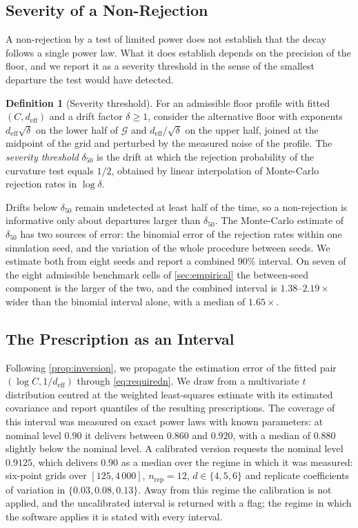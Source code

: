 \documentclass[twoside,11pt]{article}
\theoremstyle{plain}
\theoremstyle{definition}
\newtheorem{defn}{Definition}
\theoremstyle{remark}
\newcommand{\deff}{\ensuremath{d_{\mathrm{eff}}}}
\begin{document}
\subsection{Severity of a Non-Rejection}\label{sec:sizing-severity}

A non-rejection by a test of limited power does not establish that the
decay follows a single power law. What it does establish depends on the
precision of the floor, and we report it as a severity threshold in the
sense of the smallest departure the test would have detected.

\begin{defn}[Severity threshold]\label{def:severity}
For an admissible floor profile with fitted $(C, \deff)$ and a drift
factor $\delta \geq 1$, consider the alternative floor with exponents
$\deff\sqrt{\delta}$ on the lower half of $\mathcal{G}$ and
$\deff/\sqrt{\delta}$ on the upper half, joined at the midpoint of the
grid and perturbed by the measured noise of the profile. The
\emph{severity threshold} $\delta_{50}$ is the drift at which the
rejection probability of the curvature test equals $1/2$, obtained by
linear interpolation of Monte-Carlo rejection rates in $\log \delta$.
\end{defn}

Drifts below $\delta_{50}$ remain undetected at least half of the time, so
a non-rejection is informative only about departures larger than
$\delta_{50}$. The Monte-Carlo estimate of $\delta_{50}$ has two sources of
error: the binomial error of the rejection rates within one simulation
seed, and the variation of the whole procedure between seeds. We estimate
both from eight seeds and report a combined $90\%$ interval. On seven
of the eight admissible benchmark cells of \cref{sec:empirical} the
between-seed component is the larger of the two, and the combined interval
is $1.38$--$2.19\times$ wider than the binomial interval alone, with a median
of $1.65\times$.

\subsection{The Prescription as an Interval}\label{sec:sizing-interval}

Following \cref{prop:inversion}, we propagate the estimation error of the
fitted pair $(\log C, 1/\deff)$ through \cref{eq:requiredn}. We draw from a
multivariate $t$ distribution centred at the weighted least-squares estimate
with its estimated covariance and report quantiles of the resulting
prescriptions. The coverage of this interval was measured on exact power
laws with known parameters: at nominal level $0.90$ it delivers between
$0.860$ and $0.920$, with a median of $0.880$ slightly below the
nominal level. A calibrated version requests the nominal level $0.9125$,
which delivers $0.90$ as a median over the regime in which it was measured:
six-point grids over $[125, 4\,000]$, $n_{\mathrm{rep}} = 12$,
$d \in \{4, 5, 6\}$ and replicate coefficients of variation in
$\{0.03, 0.08, 0.13\}$. Away from this regime the calibration is not
applied, and the uncalibrated interval is returned with a flag; the regime
in which the software applies it is stated with every interval.
\end{document}
